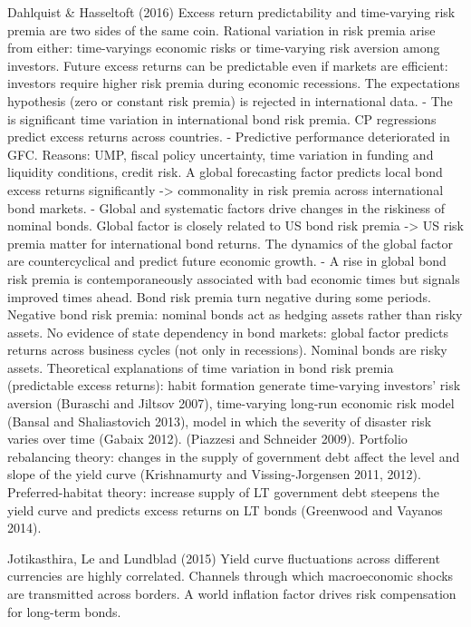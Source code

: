 Dahlquist \& Hasseltoft (2016)
Excess return predictability and time-varying risk premia are two sides of the same coin.
Rational variation in risk premia arise from either: time-varyings economic risks or time-varying risk aversion among investors.
Future excess returns can be predictable even if markets are efficient: investors require higher risk premia during economic recessions.
The expectations hypothesis (zero or constant risk premia) is rejected in international data.
- The is significant time variation in international bond risk premia.
CP regressions predict excess returns across countries. 
- Predictive performance deteriorated in GFC. Reasons: UMP, fiscal policy uncertainty, time variation in funding and liquidity conditions, credit risk.
A global forecasting factor predicts local bond excess returns significantly -> commonality in risk premia across international bond markets.
- Global and systematic factors drive changes in the riskiness of nominal bonds.
Global factor is closely related to US bond risk premia -> US risk premia matter for international bond returns.
The dynamics of the global factor are countercyclical and predict future economic growth.
- A rise in global bond risk premia is contemporaneously associated with bad economic times but signals improved times ahead.
Bond risk premia turn negative during some periods.
Negative bond risk premia: nominal bonds act as hedging assets rather than risky assets.
No evidence of state dependency in bond markets: global factor predicts returns across business cycles (not only in recessions).
Nominal bonds are risky assets. Theoretical explanations of time variation in bond risk premia (predictable excess returns): habit formation generate time-varying investors' risk aversion (Buraschi and Jiltsov 2007), time-varying long-run economic risk model (Bansal and Shaliastovich 2013), model in which the severity of disaster risk varies over time (Gabaix 2012). (Piazzesi and Schneider 2009).
Portfolio rebalancing theory: changes in the supply of government debt affect the level and slope of the yield curve (Krishnamurty and Vissing-Jorgensen 2011, 2012). Preferred-habitat theory: increase supply of LT government debt steepens the yield curve and predicts excess returns on LT bonds (Greenwood and Vayanos 2014).


Jotikasthira, Le and Lundblad (2015)
Yield curve fluctuations across different currencies are highly correlated.
Channels through which macroeconomic shocks are transmitted across borders.
A world inflation factor drives risk compensation for long-term bonds.


